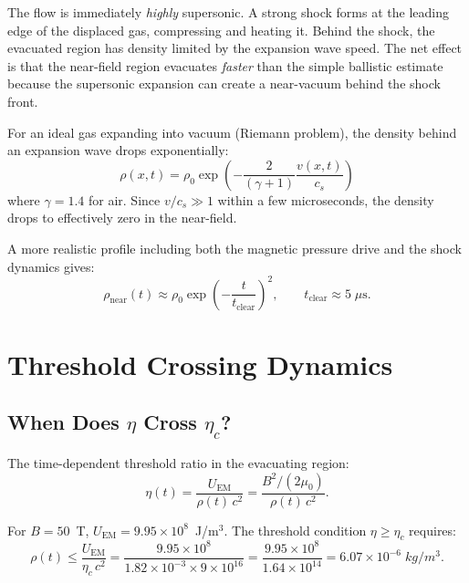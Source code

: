\documentclass[amsmath,amssymb,aps,prd,superscriptaddress,nofootinbib]{revtex4-2}
\newcommand{\etac}{\eta_c}
\begin{document}
The flow is immediately \emph{highly} supersonic. A strong shock forms
at the leading edge of the displaced gas, compressing and heating it.
Behind the shock, the evacuated region has density limited by the
expansion wave speed. The net effect is that the near-field region
evacuates \emph{faster} than the simple ballistic estimate because
the supersonic expansion can create a near-vacuum behind the shock front.

For an ideal gas expanding into vacuum (Riemann problem), the density
behind an expansion wave drops exponentially:
\begin{equation}\label{eq:rho-expansion}
\rho(x, t) = \rho_0 \exp\!\left(-\frac{2}{(\gamma+1)}\frac{v(x,t)}{c_s}\right)
\end{equation}
where $\gamma = 1.4$ for air. Since $v/c_s \gg 1$ within a few
microseconds, the density drops to effectively zero in the near-field.

A more realistic profile including both the magnetic pressure drive and
the shock dynamics gives:
\begin{equation}\label{eq:rho-refined}
\rho_\text{near}(t) \approx \rho_0 \exp\!\left(-\frac{t}{t_\text{clear}}\right)^2,
\qquad t_\text{clear} \approx 5 \; \mu\text{s}.
\end{equation}

\section{Threshold Crossing Dynamics}\label{sec:threshold-crossing}

\subsection{When Does $\eta$ Cross $\etac$?}

The time-dependent threshold ratio in the evacuating region:
\begin{equation}
\eta(t) = \frac{U_\text{EM}}{\rho(t) \, c^2}
= \frac{B^2/(2\mu_0)}{\rho(t) \, c^2}.
\end{equation}

For $B = 50$~T, $U_\text{EM} = 9.95 \times 10^8$~J/m$^3$. The
threshold condition $\eta \geq \etac$ requires:
\begin{equation}
\rho(t) \leq \frac{U_\text{EM}}{\etac \, c^2}
= \frac{9.95 \times 10^8}{1.82 \times 10^{-3} \times 9 \times 10^{16}}
= \frac{9.95 \times 10^8}{1.64 \times 10^{14}}
= 6.07 \times 10^{-6} \; \si{kg/m^3}.
\end{equation}
\end{document}
